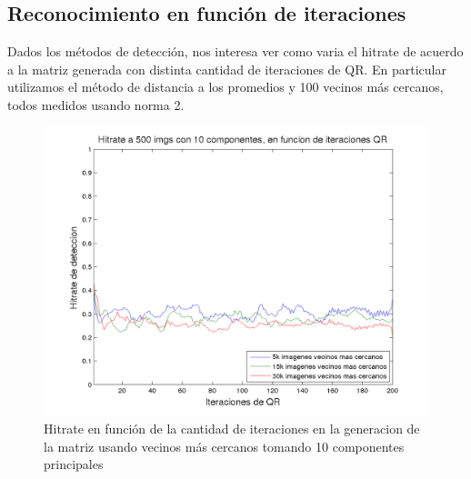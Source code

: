 
\subsection{Reconocimiento en funci\'on de iteraciones}
Dados los m\'etodos de detecci\'on, nos interesa ver como varia el hitrate
de acuerdo a la matriz generada con distinta cantidad de iteraciones de QR. En particular
utilizamos el m\'etodo de distancia a los promedios y 100 vecinos m\'as cercanos, todos
medidos usando norma 2.

\begin{figure}[H]
\begin {center}
\includegraphics[width=\hrwidth]{plots/HR_10_1.png}
\end {center}
\caption{Hitrate en funci\'on de la cantidad de iteraciones en la generacion de la matriz
usando vecinos m\'as cercanos tomando 10 componentes principales}
\label{fig:HR10Neig}
\end{figure}


